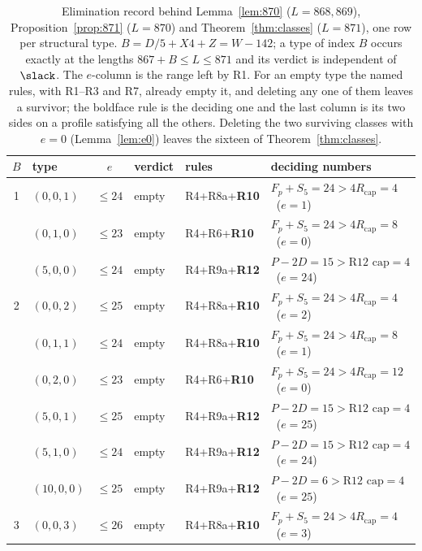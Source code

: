 \begin{table}[htbp]\centering\footnotesize
\setlength{\tabcolsep}{4pt}
\caption{Elimination record behind Lemma~\ref{lem:870} ($L=868,869$), Proposition~\ref{prop:871} ($L=870$) and Theorem~\ref{thm:classes} ($L=871$), one row per structural type.  $B=D/5+X4+Z=W-142$; a type of index $B$ occurs exactly at the lengths $867+B\le L\le871$ and its verdict is independent of $\slack$.  The $e$-column is the range left by R1.  For an empty type the named rules, with R1--R3 and R7, already empty it, and deleting any one of them leaves a survivor; the boldface rule is the deciding one and the last column is its two sides on a profile satisfying all the others.  Deleting the two surviving classes with $e=0$ (Lemma~\ref{lem:e0}) leaves the sixteen of Theorem~\ref{thm:classes}.}
\label{tab:elim}
\begin{tabular}{@{}clcl>{\raggedright\arraybackslash}p{29mm}>{\raggedright\arraybackslash}p{51mm}@{}}
\toprule
$B$ & type & $e$ & verdict & rules & deciding numbers\\
\midrule
1 & $(0,0,1)$ & $\le24$ & empty & R4+\allowbreak R8a+\allowbreak \textbf{R10} & $F_p+S_5=24>4R_{\mathrm{cap}}=4$ \ ($e=1$)\\
 & $(0,1,0)$ & $\le23$ & empty & R4+\allowbreak R6+\allowbreak \textbf{R10} & $F_p+S_5=24>4R_{\mathrm{cap}}=8$ \ ($e=0$)\\
 & $(5,0,0)$ & $\le24$ & empty & R4+\allowbreak R9a+\allowbreak \textbf{R12} & $P-2D=15>\text{R12 cap}=4$ \ ($e=24$)\\
\midrule
2 & $(0,0,2)$ & $\le25$ & empty & R4+\allowbreak R8a+\allowbreak \textbf{R10} & $F_p+S_5=24>4R_{\mathrm{cap}}=4$ \ ($e=2$)\\
 & $(0,1,1)$ & $\le24$ & empty & R4+\allowbreak R8a+\allowbreak \textbf{R10} & $F_p+S_5=24>4R_{\mathrm{cap}}=8$ \ ($e=1$)\\
 & $(0,2,0)$ & $\le23$ & empty & R4+\allowbreak R6+\allowbreak \textbf{R10} & $F_p+S_5=24>4R_{\mathrm{cap}}=12$ \ ($e=0$)\\
 & $(5,0,1)$ & $\le25$ & empty & R4+\allowbreak R9a+\allowbreak \textbf{R12} & $P-2D=15>\text{R12 cap}=4$ \ ($e=25$)\\
 & $(5,1,0)$ & $\le24$ & empty & R4+\allowbreak R9a+\allowbreak \textbf{R12} & $P-2D=15>\text{R12 cap}=4$ \ ($e=24$)\\
 & $(10,0,0)$ & $\le25$ & empty & R4+\allowbreak R9a+\allowbreak \textbf{R12} & $P-2D=6>\text{R12 cap}=4$ \ ($e=25$)\\
\midrule
3 & $(0,0,3)$ & $\le26$ & empty & R4+\allowbreak R8a+\allowbreak \textbf{R10} & $F_p+S_5=24>4R_{\mathrm{cap}}=4$ \ ($e=3$)\\

\end{tabular}
\end{table}
